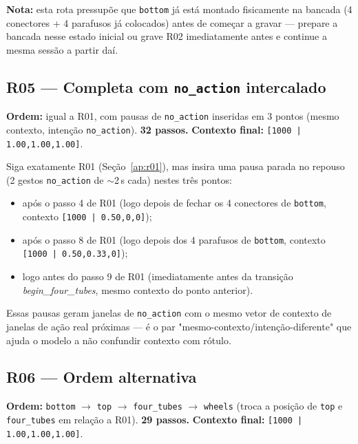 \documentclass[11pt,a4paper]{article}
\begin{document}
\textbf{Nota:} esta rota pressupõe que \texttt{bottom} já está montado
fisicamente na bancada (4 conectores + 4 parafusos já colocados) antes de
começar a gravar --- prepare a bancada nesse estado inicial ou grave R02
imediatamente antes e continue a mesma sessão a partir daí.

\subsection{R05 --- Completa com \texttt{no\_action} intercalado}
\label{ap:r05}

\textbf{Ordem:} igual a R01, com pausas de \texttt{no\_action} inseridas em
3 pontos (mesmo contexto, intenção \texttt{no\_action}). \textbf{32
passos.} \textbf{Contexto final:} \texttt{[1000\,|\,1.00,1.00,1.00]}.

Siga exatamente R01 (Seção~\ref{ap:r01}), mas insira uma pausa parada no
repouso (2 gestos \texttt{no\_action} de $\sim$2\,s cada) nestes três
pontos:

\begin{itemize}[leftmargin=1.5em]
\item após o passo 4 de R01 (logo depois de fechar os 4 conectores de \texttt{bottom}, contexto \texttt{[1000\,|\,0.50,0,0]});
\item após o passo 8 de R01 (logo depois dos 4 parafusos de \texttt{bottom}, contexto \texttt{[1000\,|\,0.50,0.33,0]});
\item logo antes do passo 9 de R01 (imediatamente antes da transição \textit{begin\_four\_tubes}, mesmo contexto do ponto anterior).
\end{itemize}

Essas pausas geram janelas de \texttt{no\_action} com o mesmo vetor de
contexto de janelas de ação real próximas --- é o par
"mesmo-contexto/intenção-diferente" que ajuda o modelo a não confundir
contexto com rótulo.

\subsection{R06 --- Ordem alternativa}
\label{ap:r06}

\textbf{Ordem:} \texttt{bottom} $\to$ \texttt{top} $\to$
\texttt{four\_tubes} $\to$ \texttt{wheels} (troca a posição de
\texttt{top} e \texttt{four\_tubes} em relação a R01). \textbf{29 passos.}
\textbf{Contexto final:} \texttt{[1000\,|\,1.00,1.00,1.00]}.
\end{document}

